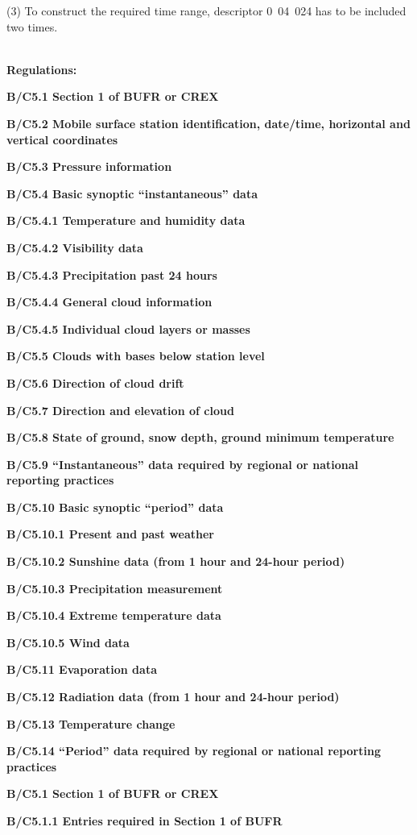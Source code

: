 (3) To construct the required time range, descriptor 0~04~024 has to be included two times.

\textbf{\\
Regulations:}

\textbf{B/C5.1 Section 1 of BUFR or CREX}

\textbf{B/C5.2 Mobile surface station identification, date/time, horizontal and vertical coordinates}

\textbf{B/C5.3 Pressure information}

\textbf{B/C5.4 Basic synoptic ``instantaneous'' data}

\textbf{B/C5.4.1 Temperature and humidity data}

\textbf{B/C5.4.2 Visibility data}

\textbf{B/C5.4.3 Precipitation past 24 hours}

\textbf{B/C5.4.4 General cloud information}

\textbf{B/C5.4.5 Individual cloud layers or masses}

\textbf{B/C5.5 Clouds with bases below station level}

\textbf{B/C5.6 Direction of cloud drift}

\textbf{B/C5.7 Direction and elevation of cloud}

\textbf{B/C5.8 State of ground, snow depth, ground minimum temperature}

\textbf{B/C5.9 ``Instantaneous'' data required by regional or national reporting practices}

\textbf{B/C5.10 Basic synoptic ``period'' data}

\textbf{B/C5.10.1 Present and past weather}

\textbf{B/C5.10.2 Sunshine data (from 1 hour and 24-hour period)}

\textbf{B/C5.10.3 Precipitation measurement}

\textbf{B/C5.10.4 Extreme temperature data}

\textbf{B/C5.10.5 Wind data}

\textbf{B/C5.11 Evaporation data}

\textbf{B/C5.12 Radiation data (from 1 hour and 24-hour period)}

\textbf{B/C5.13 Temperature change}

\textbf{B/C5.14 ``Period'' data required by regional or national reporting practices}

\textbf{B/C5.1 Section 1 of BUFR or CREX}

\textbf{B/C5.1.1 Entries required in Section 1 of BUFR}

